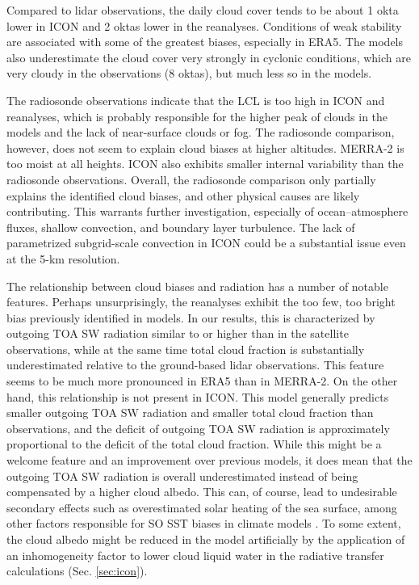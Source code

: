 \documentclass[draft]{agujournal2019}
\begin{document}
Compared to lidar observations, the daily cloud cover tends to be about 1 okta lower in ICON and 2 oktas lower in the reanalyses. Conditions of weak stability are associated with some of the greatest biases, especially in ERA5. The models also underestimate the cloud cover very strongly in cyclonic conditions, which are very cloudy in the observations (8 oktas), but much less so in the models.

The radiosonde observations indicate that the LCL is too high in ICON and reanalyses, which is probably responsible for the higher peak of clouds in the models and the lack of near-surface clouds or fog. The radiosonde comparison, however, does not seem to explain cloud biases at higher altitudes. MERRA-2 is too moist at all heights. ICON also exhibits smaller internal variability than the radiosonde observations. Overall, the radiosonde comparison only partially explains the identified cloud biases, and other physical causes are likely contributing. This warrants further investigation, especially of ocean--atmosphere fluxes, shallow convection, and boundary layer turbulence. The lack of parametrized subgrid-scale convection in ICON could be a substantial issue even at the 5-km resolution.

The relationship between cloud biases and radiation has a number of notable features. Perhaps unsurprisingly, the reanalyses exhibit the too few, too bright bias previously identified in models. In our results, this is characterized by outgoing TOA SW radiation similar to or higher than in the satellite observations, while at the same time total cloud fraction is substantially underestimated relative to the ground-based lidar observations. This feature seems to be much more pronounced in ERA5 than in MERRA-2. On the other hand, this relationship is not present in ICON. This model generally predicts smaller outgoing TOA SW radiation and smaller total cloud fraction than observations, and the deficit of outgoing TOA SW radiation is approximately proportional to the deficit of the total cloud fraction. While this might be a welcome feature and an improvement over previous models, it does mean that the outgoing TOA SW radiation is overall underestimated instead of being compensated by a higher cloud albedo. This can, of course, lead to undesirable secondary effects such as overestimated solar heating of the sea surface, among other factors responsible for SO SST biases in climate models . To some extent, the cloud albedo might be reduced in the model artificially by the application of an inhomogeneity factor to lower cloud liquid water in the radiative transfer calculations (Sec. \ref{sec:icon}).
\end{document}
